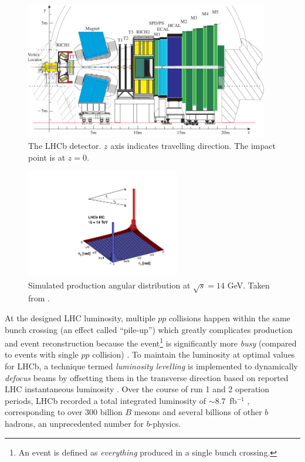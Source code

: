 \begin{figure}[!htb]
    \centering
    \includegraphics[width=0.95\textwidth]{./figs-detector/lhcb_detector_view.pdf}
    \caption{
        The LHCb detector.
        $z$ axis indicates \bbbar travelling direction.
        The impact point is at $z = 0$.
    }
    \label{fig:lhcb-detector}
\end{figure}

\begin{figure}[!htb]
    \centering
    \includegraphics[width=0.6\textwidth]{./figs-detector/14_rad_acc_scheme_right.pdf}
    \caption{
        Simulated \bbbar production angular distribution at $\sqrt{s} = 14$ GeV.
        Taken from \cite{LHCb_bb_prod_angle}.
    }
    \label{fig:bbbar-prod-angular}
\end{figure}

At the designed LHC luminosity, multiple $pp$ collisions happen within the
same bunch crossing (an effect called ``pile-up'')
which greatly complicates \bbbar production and event reconstruction because
the event\footnote{
    An event is defined as \emph{everything} produced in a single bunch
    crossing.
} is significantly more \emph{busy}
(compared to events with single $pp$ collision)
\cite{Altarelli_2008}.
To maintain the luminosity at optimal values for LHCb,
a technique termed \emph{luminosity levelling} is implemented to dynamically
\emph{defocus} beams by offsetting them in the transverse direction based
on reported LHC instantaneous luminosity
\cite{https://doi.org/10.5170/cern-2014-004.183}.
Over the course of run 1 and 2 operation periods, LHCb recorded a total
integrated luminosity of $\sim 8.7$~fb$^{-1}$
\cite{LHCb_lumi},
corresponding to over 300 billion $B$ mesons and several billions of other
$b$ hadrons,
an unprecedented number for $b$-physics.

